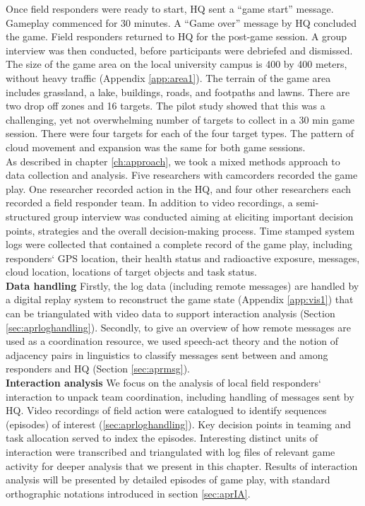 Once field responders were ready to start, HQ sent a ``game start'' message. Gameplay commenced for 30 minutes. A ``Game over'' message by HQ concluded the game. Field responders returned to HQ for the post-game session. A group interview was then conducted, before participants were debriefed and dismissed.\\

The size of the game area on the local university campus is 400 by 400 meters, without heavy traffic (Appendix \ref{app:area1}). The terrain of the game area includes grassland, a lake, buildings, roads, and footpaths and lawns. There are two drop off zones and 16 targets. The pilot study showed that this was a challenging, yet not overwhelming number of targets to collect in a 30 min game session. There were four targets for each of the four target types. The pattern of cloud movement and expansion was the same for both game sessions.\\

As described in chapter \ref{ch:approach}, we took a mixed methods approach to data collection and analysis. Five researchers with camcorders recorded the game play. One researcher recorded action in the HQ, and four other researchers each recorded a field responder team. In addition to video recordings, a semi-structured group interview was conducted aiming at eliciting important decision points, strategies and the overall decision-making process. Time stamped system logs were collected that contained a complete record of the game play, including responders` GPS location, their health status and radioactive exposure, messages, cloud location, locations of target objects and task status. \\

\textbf{Data handling} Firstly, the log data (including remote messages) are handled by a digital replay system to reconstruct the game state (Appendix \ref{app:vis1}) that can be triangulated with video data to support interaction analysis (Section \ref{sec:aprloghandling}). Secondly, to give an overview of how remote messages are used as a coordination resource, we used speech-act theory and the notion of adjacency pairs in linguistics to classify messages sent between and among responders and HQ (Section \ref{sec:aprmsg}).\\

\textbf{Interaction analysis} We focus on the analysis of local field responders` interaction to unpack team coordination, including handling of messages sent by HQ. Video recordings of field action were catalogued to identify sequences (episodes) of interest (\ref{sec:aprloghandling}). Key decision points in teaming and task allocation served to index the episodes. Interesting distinct units of interaction were transcribed and triangulated with log files of relevant game activity for deeper analysis that we present in this chapter. Results of interaction analysis will be presented by detailed episodes of game play, with standard orthographic notations introduced in section \ref{sec:aprIA}. \\

